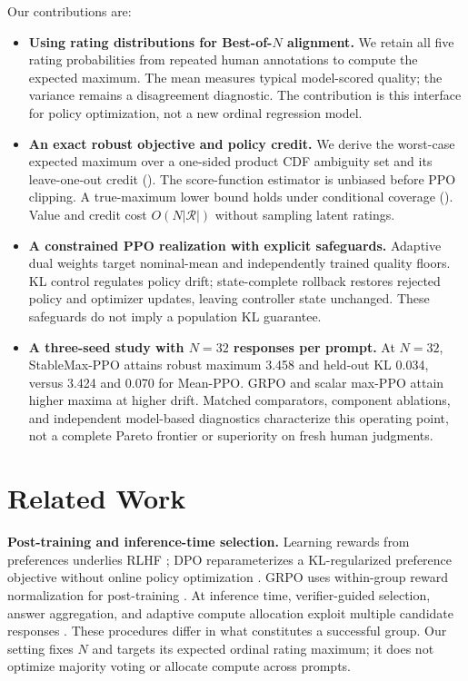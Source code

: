 \documentclass{article}
\newcommand{\method}{StableMax-PPO}
\theoremstyle{definition}
\theoremstyle{remark}
\begin{document}
Our contributions are:
\begin{itemize}
\item \textbf{Using rating distributions for Best-of-\(N\) alignment.}
We retain all five rating probabilities from repeated human annotations to
compute the expected maximum. The mean measures typical model-scored quality;
the variance remains a disagreement diagnostic. The contribution is this
interface for policy optimization, not a new ordinal regression model.

\item \textbf{An exact robust objective and policy credit.}
We derive the worst-case expected maximum over a one-sided product CDF
ambiguity set and its leave-one-out credit
(). The score-function estimator is
unbiased before PPO clipping. A true-maximum lower bound holds under conditional
coverage (). Value and credit cost
\(O(N|\mathcal R|)\) without sampling latent ratings.

\item \textbf{A constrained PPO realization with explicit safeguards.}
Adaptive dual weights target nominal-mean and independently trained quality
floors. KL control regulates policy drift; state-complete rollback restores
rejected policy and optimizer updates, leaving controller state unchanged. These
safeguards do not imply a population KL guarantee.

\item \textbf{A three-seed study with \(N=32\) responses per prompt.}
At \(N=32\), \method{} attains robust maximum 3.458 and held-out KL 0.034,
versus 3.424 and 0.070 for Mean-PPO. GRPO and scalar max-PPO attain higher maxima
at higher drift. Matched comparators, component ablations, and independent
model-based diagnostics characterize this operating point, not a complete
Pareto frontier or superiority on fresh human judgments.
\end{itemize}

\section{Related Work}
\label{sec:related}

\textbf{Post-training and inference-time selection.}
Learning rewards from preferences underlies RLHF
\citep{christiano2017deep,stiennon2020learning,ouyang2022training}; DPO
reparameterizes a KL-regularized preference objective without online policy
optimization \citep{rafailov2023direct}. GRPO uses within-group reward
normalization for post-training \citep{shao2024deepseekmath,guo2025deepseekr1}.
At inference time, verifier-guided selection, answer aggregation, and adaptive
compute allocation exploit multiple candidate responses
\citep{cobbe2021training,wang2023selfconsistency,snell2025scaling}.
These procedures differ in what constitutes a successful group. Our setting
fixes \(N\) and targets its expected ordinal rating maximum;
it does not optimize majority voting or allocate compute across prompts.
\end{document}
